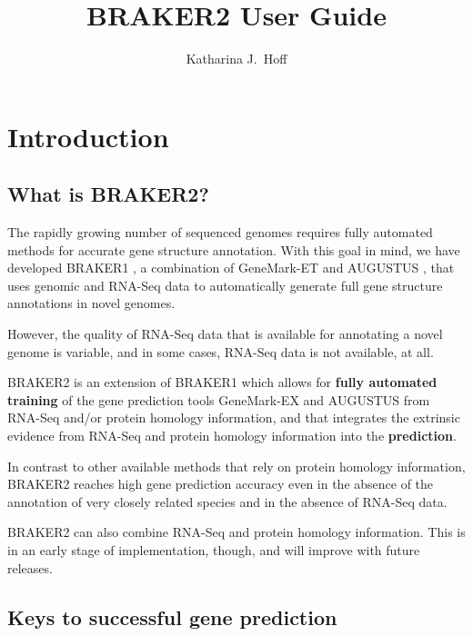 \documentclass[a4paper,10pt]{report}
\title{BRAKER2 User Guide}
\author{Katharina J.~Hoff}
\begin{document}
\maketitle

\tableofcontents

\chapter{Introduction}

\section{What is BRAKER2?}

The rapidly growing number of sequenced genomes requires fully automated methods for accurate gene structure annotation. With this goal in mind, we have developed BRAKER1 \cite{braker1}, a combination of GeneMark-ET \cite{GeneMark-ET} and AUGUSTUS \cite{AUGUSTUS}, that uses genomic and RNA-Seq data to automatically generate full gene structure annotations in novel genomes.

However, the quality of RNA-Seq data that is available for annotating a novel genome is variable, and in some cases, RNA-Seq data is not available, at all.

BRAKER2 is an extension of BRAKER1 which allows for \textbf{fully automated training} of the gene prediction tools GeneMark-EX and AUGUSTUS from RNA-Seq and/or protein homology information, and that integrates the extrinsic evidence from RNA-Seq and protein homology information into the \textbf{prediction}.

In contrast to other available methods that rely on protein homology information, BRAKER2 reaches high gene prediction accuracy even in the absence of the annotation of very closely related species and in the absence of RNA-Seq data. 

BRAKER2 can also combine RNA-Seq and protein homology information. This is in an early stage of implementation, though, and will improve with future releases.

\section{Keys to successful gene prediction}
\end{document}
